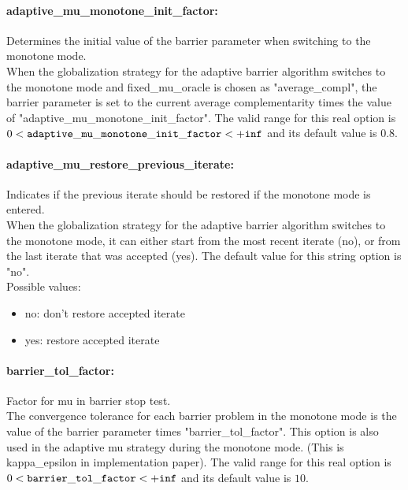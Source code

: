 \paragraph{adaptive\_mu\_monotone\_init\_factor:}\label{opt:adaptive_mu_monotone_init_factor} Determines the initial value of the barrier parameter when switching to the monotone mode. \\
 When the globalization strategy for the adaptive barrier algorithm switches to the monotone mode and fixed\_mu\_oracle is chosen as "average\_compl", the barrier parameter is set to the current average complementarity times the value of "adaptive\_mu\_monotone\_init\_factor". The valid range for this real option is 
$0 <  {\tt adaptive\_mu\_monotone\_init\_factor } <  {\tt +inf}$
and its default value is $0.8$.


\paragraph{adaptive\_mu\_restore\_previous\_iterate:}\label{opt:adaptive_mu_restore_previous_iterate} Indicates if the previous iterate should be restored if the monotone mode is entered. \\
 When the globalization strategy for the adaptive barrier algorithm switches to the monotone mode, it can either start from the most recent iterate (no), or from the last iterate that was accepted (yes). The default value for this string option is "no".
\\ 
Possible values:
\begin{itemize}
   \item no: don't restore accepted iterate
   \item yes: restore accepted iterate
\end{itemize}

\paragraph{barrier\_tol\_factor:}\label{opt:barrier_tol_factor} Factor for mu in barrier stop test. \\
 The convergence tolerance for each barrier problem in the monotone mode is the value of the barrier parameter times "barrier\_tol\_factor". This option is also used in the adaptive mu strategy during the monotone mode. (This is kappa\_epsilon in implementation paper). The valid range for this real option is 
$0 <  {\tt barrier\_tol\_factor } <  {\tt +inf}$
and its default value is $10$.


